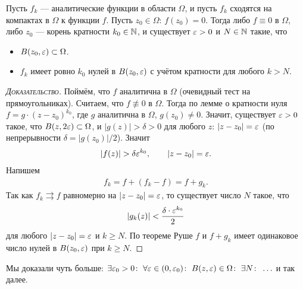 \documentclass[../complex-analysis.tex]{subfiles}
\begin{document}
 \begin{crly}
  Пусть $ f_k $ --- аналитические функции в области $ \Omega $, и пусть $ f_k $ сходятся на компактах в $ \Omega $ к функции $ f $. Пусть $ z_0 \in \Omega $: $ f(z_0)=0 $. Тогда либо $ f \equiv 0 $ в $ \Omega $, либо $ z_0 $ --- корень кратности $ k_0 \in \mathbb{N} $, и существует $ \varepsilon > 0 $ и $ N \in \mathbb{N} $ такие, что
  \begin{itemize}
   \item $ B(z_0, \varepsilon) \subset \Omega $.
   \item $ f_k $ имеет ровно $ k_0 $ нулей в $ B(z_0, \varepsilon) $ с учётом кратности для любого $ k > N $.
  \end{itemize}
 \end{crly}
 \begin{proof}[\normalfont\textsc{Доказательство}]
  Поймём, что $ f $ аналитична в $ \Omega $ (очевидный тест на прямоугольниках). Считаем, что $ f \not\equiv 0 $ в $ \Omega $. Тогда по лемме о кратности нуля $ f = g\cdot(z - z_0)^{k_0} $, где $ g $ аналитична в $ \Omega $, $ g(z_0) \neq 0 $. Значит, существует $ \varepsilon > 0 $ такое, что $ B(z, 2\varepsilon) \subset \Omega $, и $ \left| g(z) \right| > \delta > 0 $ для любого $ z $: $ \left| z - z_0 \right| = \varepsilon $ (по непрерывности $ \delta = \left| g(z_0) \right| / 2 $). Значит
  \begin{align*}
   \left|f(z) \right| > \delta \varepsilon^{k_0}, \qquad \left| z-z_0 \right|=\varepsilon.
  \end{align*} Напишем
  \begin{align*}
   f_k = f + (f_k - f) = f + g_k.
  \end{align*} Так как $ f_k \rightrightarrows f $ равномерно на $ \left| z - z_0 \right| = \varepsilon $, то существует число $ N $ такое, что
  \begin{align*}
   \left|g_k(z) \right| < \frac{\delta \cdot \varepsilon^{k_0}}{2}
  \end{align*} для любого $ \left| z-z_0 \right|=\varepsilon $ и $ k \geqslant N $. По теореме Руше $ f $ и $ f + g_k $ имеет одинаковое число нулей в $ B(z_0,\varepsilon) $ при $ k \geqslant N $.
 \end{proof}

 Мы доказали чуть больше: $ \exists \varepsilon_0 > 0 \colon\; \forall \varepsilon \in (0, \varepsilon_0) \colon\; B(z,\varepsilon) \in \Omega \colon\; \exists N \colon\;\ldots  $ и так далее.
\end{document}
